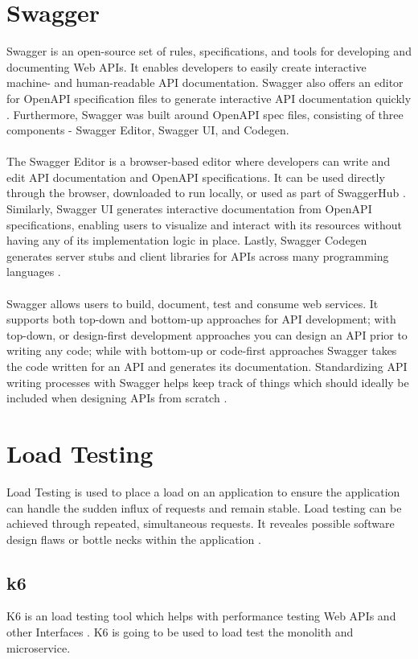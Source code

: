 \documentclass[BIF,Bachelor,nenglish]{twbook}%
\begin{document}
\section{Swagger}
Swagger is an open-source set of rules, specifications, and tools for developing and documenting Web APIs. It enables developers to easily create interactive machine- and human-readable API documentation. Swagger also offers an editor for OpenAPI specification files to generate interactive API documentation quickly \cite{javapoint}. Furthermore, Swagger was built around OpenAPI spec files, consisting of three components - Swagger Editor, Swagger UI, and Codegen.
\\
\\
The Swagger Editor is a browser-based editor where developers can write and edit API documentation and OpenAPI specifications. It can be used directly through the browser, downloaded to run locally, or used as part of SwaggerHub \cite{hubspot}. Similarly, Swagger UI generates interactive documentation from OpenAPI specifications, enabling users to visualize and interact with its resources without having any of its implementation logic in place. Lastly, Swagger Codegen generates server stubs and client libraries for APIs across many programming languages \cite{swagger}.
\\
\\
Swagger allows users to build, document, test and consume web services. It supports both top-down and bottom-up approaches for API development; with top-down, or design-first development approaches you can design an API prior to writing any code; while with bottom-up or code-first approaches Swagger takes the code written for an API and generates its documentation. Standardizing API writing processes with Swagger helps keep track of things which should ideally be included when designing APIs from scratch \cite{scaleyourapp}.

\section{Load Testing}
Load Testing is used to place a load on an application to ensure the application can handle the sudden influx of requests and remain stable. Load testing can be achieved through repeated, simultaneous requests. It reveales possible software design flaws or bottle necks within the application \cite{loadtest}.
\subsection{k6}
K6 is an load testing tool which helps with performance testing Web APIs and other Interfaces \cite{k6doc}. K6 is going to be used to load test the monolith and microservice.
\end{document}
